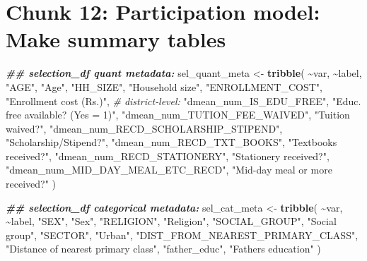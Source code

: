 \documentclass[
]{article}
\newenvironment{Shaded}{\begin{snugshade}}{\end{snugshade}}
\newcommand{\CommentTok}[1]{\textcolor[rgb]{0.56,0.35,0.01}{\textit{#1}}}
\newcommand{\DocumentationTok}[1]{\textcolor[rgb]{0.56,0.35,0.01}{\textbf{\textit{#1}}}}
\newcommand{\FunctionTok}[1]{\textcolor[rgb]{0.13,0.29,0.53}{\textbf{#1}}}
\newcommand{\NormalTok}[1]{#1}
\newcommand{\OtherTok}[1]{\textcolor[rgb]{0.56,0.35,0.01}{#1}}
\newcommand{\SpecialCharTok}[1]{\textcolor[rgb]{0.81,0.36,0.00}{\textbf{#1}}}
\newcommand{\StringTok}[1]{\textcolor[rgb]{0.31,0.60,0.02}{#1}}
\begin{document}
\section*{Chunk 12: Participation model: Make summary tables}\label{chunk-12-participation-model-make-summary-tables}

\begin{Shaded}
\begin{Highlighting}[]
\DocumentationTok{\#\# selection\_df quant metadata:}
\NormalTok{sel\_quant\_meta }\OtherTok{\textless{}{-}} \FunctionTok{tribble}\NormalTok{(}
  \SpecialCharTok{\textasciitilde{}}\NormalTok{var, }\SpecialCharTok{\textasciitilde{}}\NormalTok{label,   }
  \StringTok{"AGE"}\NormalTok{, }\StringTok{"Age"}\NormalTok{,}
  \StringTok{"HH\_SIZE"}\NormalTok{, }\StringTok{"Household size"}\NormalTok{,}
  \StringTok{"ENROLLMENT\_COST"}\NormalTok{, }\StringTok{"Enrollment cost (Rs.)"}\NormalTok{,}
  \CommentTok{\# district‐level:}
  \StringTok{"dmean\_num\_IS\_EDU\_FREE"}\NormalTok{, }\StringTok{"Educ. free available? (Yes = 1)"}\NormalTok{,}
  \StringTok{"dmean\_num\_TUTION\_FEE\_WAIVED"}\NormalTok{, }\StringTok{"Tuition waived?"}\NormalTok{,}
  \StringTok{"dmean\_num\_RECD\_SCHOLARSHIP\_STIPEND"}\NormalTok{, }\StringTok{"Scholarship/Stipend?"}\NormalTok{,}
  \StringTok{"dmean\_num\_RECD\_TXT\_BOOKS"}\NormalTok{, }\StringTok{"Textbooks received?"}\NormalTok{,}
  \StringTok{"dmean\_num\_RECD\_STATIONERY"}\NormalTok{, }\StringTok{"Stationery received?"}\NormalTok{,}
  \StringTok{"dmean\_num\_MID\_DAY\_MEAL\_ETC\_RECD"}\NormalTok{, }\StringTok{"Mid{-}day meal or more received?"}
\NormalTok{)}

\DocumentationTok{\#\# selection\_df categorical metadata:}
\NormalTok{sel\_cat\_meta }\OtherTok{\textless{}{-}} \FunctionTok{tribble}\NormalTok{(}
  \SpecialCharTok{\textasciitilde{}}\NormalTok{var, }\SpecialCharTok{\textasciitilde{}}\NormalTok{label,}
  \StringTok{"SEX"}\NormalTok{, }\StringTok{"Sex"}\NormalTok{,}
  \StringTok{"RELIGION"}\NormalTok{, }\StringTok{"Religion"}\NormalTok{,}
  \StringTok{"SOCIAL\_GROUP"}\NormalTok{, }\StringTok{"Social group"}\NormalTok{,}
  \StringTok{"SECTOR"}\NormalTok{, }\StringTok{"Urban"}\NormalTok{,}
  \StringTok{"DIST\_FROM\_NEAREST\_PRIMARY\_CLASS"}\NormalTok{, }\StringTok{"Distance of nearest primary class"}\NormalTok{,}
  \StringTok{"father\_educ"}\NormalTok{, }\StringTok{"Father\textquotesingle{}s education"}
\NormalTok{)}


\end{Highlighting}
\end{Shaded}
\end{document}
